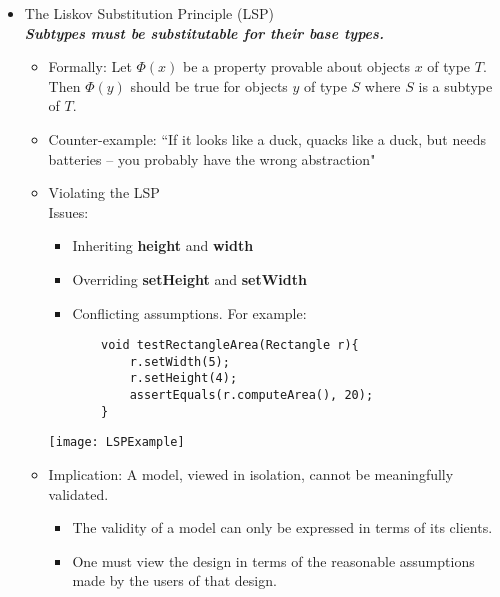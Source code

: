 \begin{itemize}
	\item The Liskov Substitution Principle (LSP)\\
	\textbf{\emph{Subtypes must be substitutable for their base types.}}
	\begin{itemize}
		\item Formally: Let $ \Phi(x) $ be a property provable about objects $ x $ of type $ T $. Then $ \Phi(y) $ should be true for objects $ y $ of type $ S $ where $ S $ is a subtype of $ T $.
		\item Counter-example: ``If it looks like a duck, quacks like a duck, but needs batteries – you probably have the wrong abstraction"
		\item Violating the LSP\\
		Issues:\\
		\begin{minipage}{0.6\textwidth}
			\begin{itemize}
				\item Inheriting \textbf{height} and \textbf{width}
				\item Overriding \textbf{setHeight} and \textbf{setWidth}
				\item Conflicting assumptions. For example:
				\begin{Verbatim}
	void testRectangleArea(Rectangle r){
		r.setWidth(5);
		r.setHeight(4);
		assertEquals(r.computeArea(), 20);
	}
				\end{Verbatim}
			\end{itemize}
		\end{minipage}
		\begin{minipage}{0.3\textwidth}
			\hspace*{2cm}\texttt{[image: LSPExample]}
		\end{minipage}

		\item Implication: A model, viewed in isolation, cannot be meaningfully validated.
		\begin{itemize}
			\item The validity of a model can only be expressed in terms of its clients.
			\item One must view the design in terms of the reasonable assumptions made by
			the users of that design.
		\end{itemize}
	\end{itemize}


\end{itemize}
